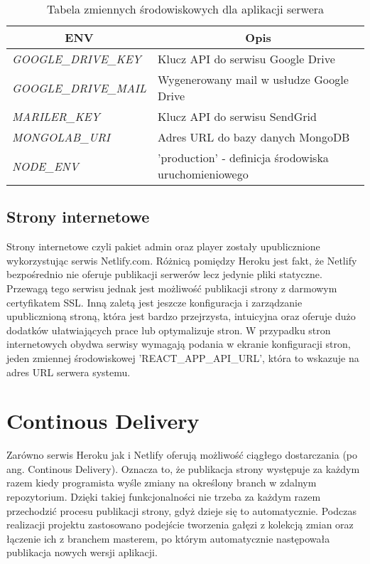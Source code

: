 \begin{table}[h!]
\centering
\begin{tabular}{|l|l|}
\hline
\multicolumn{1}{|c|}{\textbf{ENV}} & \multicolumn{1}{c|}{\textbf{Opis}} \\ \hline
\textit{GOOGLE\_DRIVE\_KEY} & Klucz API do serwisu Google Drive \\ \hline
\textit{GOOGLE\_DRIVE\_MAIL} & Wygenerowany mail w usłudze Google Drive \\ \hline
\textit{MARILER\_KEY} & Klucz API do serwisu SendGrid \\ \hline
\textit{MONGOLAB\_URI} & Adres URL do bazy danych MongoDB \\ \hline
\textit{NODE\_ENV} & 'production' - definicja środowiska uruchomieniowego \\ \hline
\end{tabular}
\caption{Tabela zmiennych środowiskowych dla aplikacji serwera}
\end{table}

\subsection{Strony internetowe}
Strony internetowe czyli pakiet admin oraz player zostały upublicznione wykorzystując serwis Netlify.com. Różnicą pomiędzy Heroku jest fakt, że Netlify bezpośrednio nie oferuje publikacji serwerów lecz jedynie pliki statyczne. Przewagą tego serwisu jednak jest możliwość publikacji strony z darmowym certyfikatem SSL. Inną zaletą jest jeszcze konfiguracja i zarządzanie upublicznioną stroną, która jest bardzo przejrzysta, intuicyjna oraz oferuje dużo dodatków ułatwiających prace lub optymalizuje stron. W przypadku stron internetowych obydwa serwisy wymagają podania w ekranie konfiguracji stron, jeden zmiennej środowiskowej 'REACT\_APP\_API\_URL', która to wskazuje na adres URL serwera systemu.

\section{Continous Delivery}
Zarówno serwis Heroku jak i Netlify oferują możliwość ciągłego dostarczania (po ang. Continous Delivery). Oznacza to, że publikacja strony występuje za każdym razem kiedy programista wyśle zmiany na określony branch w zdalnym repozytorium. Dzięki takiej funkcjonalności nie trzeba za każdym razem przechodzić procesu publikacji strony, gdyż dzieje się to automatycznie. Podczas realizacji projektu zastosowano podejście tworzenia gałęzi z kolekcją zmian oraz łączenie ich z branchem masterem, po którym automatycznie następowała publikacja nowych wersji aplikacji.